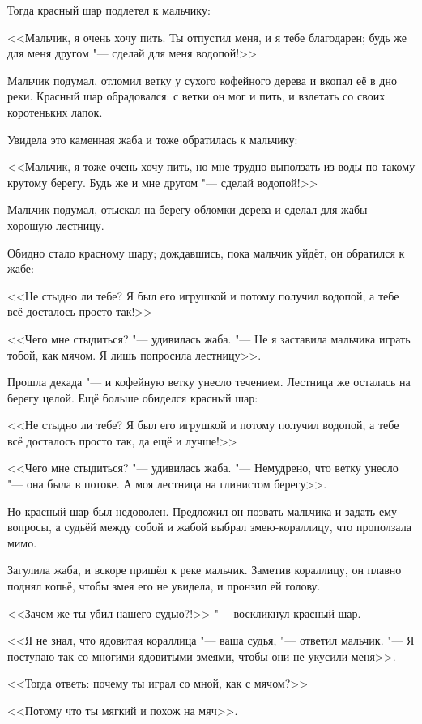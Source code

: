 Тогда красный шар подлетел к мальчику:

<<Мальчик, я очень хочу пить.
Ты отпустил меня, и я тебе благодарен;
будь же для меня другом "--- сделай для меня водопой!>>

Мальчик подумал, отломил ветку у сухого кофейного дерева и вкопал её в дно реки.
Красный шар обрадовался: с ветки он мог и пить, и взлетать со своих коротеньких лапок.

Увидела это каменная жаба и тоже обратилась к мальчику:

<<Мальчик, я тоже очень хочу пить, но мне трудно выползать из воды по такому крутому берегу.
Будь же и мне другом "--- сделай водопой!>>

Мальчик подумал, отыскал на берегу обломки дерева и сделал для жабы хорошую лестницу.

Обидно стало красному шару;
дождавшись, пока мальчик уйдёт, он обратился к жабе:

<<Не стыдно ли тебе?
Я был его игрушкой и потому получил водопой, а тебе всё досталось просто так!>>

<<Чего мне стыдиться? "--- удивилась жаба.
"--- Не я заставила мальчика играть тобой, как мячом.
Я лишь попросила лестницу>>.

Прошла декада "--- и кофейную ветку унесло течением.
Лестница же осталась на берегу целой.
Ещё больше обиделся красный шар:

<<Не стыдно ли тебе?
Я был его игрушкой и потому получил водопой, а тебе всё досталось просто так, да ещё и лучше!>>

<<Чего мне стыдиться? "--- удивилась жаба.
"--- Немудрено, что ветку унесло "--- она была в потоке.
А моя лестница на глинистом берегу>>.

Но красный шар был недоволен.
Предложил он позвать мальчика и задать ему вопросы, а судьёй между собой и жабой выбрал змею-кораллицу, что проползала мимо.

Загулила жаба, и вскоре пришёл к реке мальчик.
Заметив кораллицу, он плавно поднял копьё, чтобы змея его не увидела, и пронзил ей голову.

<<Зачем же ты убил нашего судью?!>> "--- воскликнул красный шар.

<<Я не знал, что ядовитая кораллица "--- ваша судья, "--- ответил мальчик.
"--- Я поступаю так со многими ядовитыми змеями, чтобы они не укусили меня>>.

<<Тогда ответь: почему ты играл со мной, как с мячом?>>

<<Потому что ты мягкий и похож на мяч>>.

